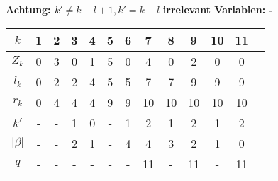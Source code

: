 \documentclass{article}
\begin{document}
\begin{flushleft}
\textbf{Achtung: $k' \not = k - l + 1, k' = k - l$}
\newline
\textbf{irrelevant Variablen: -}
\newline \\
    \begin{tabular}{|c||c|c|c|c|c|c|c|c|c|c|c|c|}
        \hline $k$ & 1 & 2 & 3 & 4 & 5 & 6 & 7 & 8 & 9 & 10 & 11 \\
        \hline $Z_k$ & 0 & 3 & 0 & 1 & 5 & 0 & 4 & 0 & 2 & 0 & 0 \\
        \hline $l_k$ & 0 & 2 & 2 & 4 & 5 & 5 & 7 & 7 & 9 & 9 & 9 \\
        \hline $r_k$ & 0 & 4 & 4 & 4 & 9 & 9 & 10 & 10 & 10 & 10 & 10 \\
        \hline $k'$ & - & - & 1 & 0 & - & 1 & 2 & 1 & 2 & 1 & 2 \\
        \hline $|\beta|$ & - & - & 2 & 1 & - & 4 & 4 & 3 & 2 & 1 & 0 \\
        \hline $q$ & - & - & - & - & - & - & 11 & - & 11 & - & 11 \\
        \hline  
    \end{tabular}
\end{flushleft}
\end{document}

